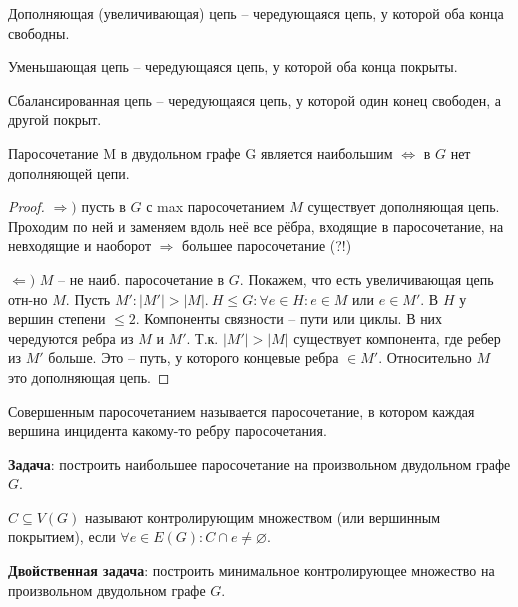 	\begin{Def}
		Дополняющая (увеличивающая) цепь -- чередующаяся цепь, у которой оба конца свободны.
	\end{Def}

	\begin{Def}
		Уменьшающая цепь -- чередующаяся цепь, у которой оба конца покрыты.
	\end{Def}

	\begin{Def}
		Сбалансированная цепь -- чередующаяся цепь, у которой один конец свободен, а другой покрыт.
	\end{Def}

	\begin{Thm}
		Паросочетание M в двудольном графе G является наибольшим $\Leftrightarrow$ в $G$ нет дополняющей цепи.
	\end{Thm}

	\begin{proof}
		$\Rightarrow)$ пусть в $G$ с max паросочетанием $M$ существует дополняющая цепь. Проходим по ней и заменяем вдоль неё все рёбра, входящие в паросочетание, на невходящие и наоборот $\Rightarrow$ большее паросочетание (?!)

		$\Leftarrow)$ $M$ -- не наиб. паросочетание в $G$. Покажем, что есть увеличивающая цепь отн-но $M$. Пусть $M': |M'| > |M|. \ H \leqslant G : \forall e \in H: e \in M$ или
		$e \in M'$. В $H$ у вершин степени $\leqslant 2$. Компоненты связности -- пути или циклы. В них чередуются ребра из $M$ и $M'$. 
		Т.к. $|M'| > |M|$ существует компонента, где ребер из $M'$ больше. Это -- путь, у которого концевые ребра $\in M'$. Относительно $M$ это дополняющая цепь.
	\end{proof}

	\begin{Def}
		Совершенным паросочетанием называется паросочетание, в котором каждая вершина инцидента какому-то ребру паросочетания.
	\end{Def}

	\textbf{Задача}: построить наибольшее паросочетание на произвольном двудольном графе $G$.

	\begin{Def}
		$C \subseteq V(G)$ называют контролирующим множеством (или вершинным покрытием), если $\forall e \in E(G) : C \cap e \neq \varnothing$.
	\end{Def}

	\textbf{Двойственная задача}: построить минимальное контролирующее множество на произвольном двудольном графе $G$.
	
